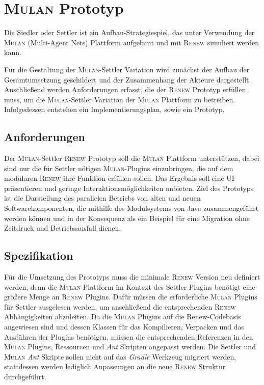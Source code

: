 \chapter{\textsc{Mulan} Prototyp} \label{cha:mulan_settler}
	Die Siedler oder Settler ist ein Aufbau-Strategiespiel, das unter Verwendung der \textsc{Mulan} (Multi-Agent Nets) Plattform aufgebaut und mit \textsc{Renew} simuliert werden kann. \bigbreak
	
	Für die Gestaltung der \textsc{Mulan}-Settler Variation wird zunächst der Aufbau der Gesamtumsetzung geschildert und der Zusammenhang der Akteure dargestellt. Anschließend werden Anforderungen erfasst, die der \textsc{Renew} Prototyp erfüllen muss, um die \textsc{Mulan}-Settler Variation der \textsc{Mulan} Plattform zu betreiben. Infolgedessen entstehen ein Implementierungsplan, sowie ein Prototyp.

\section{Anforderungen} \label{sec:anforderungen2}
	Der \textsc{Mulan}-Settler \textsc{Renew} Prototyp soll die \textsc{Mulan} Plattform unterstützen, dabei sind nur die für Settler nötigen \textsc{Mulan}-Plugins einzubringen, die auf dem modularen \textsc{Renew} ihre Funktion erfüllen sollen. Das Ergebnis soll eine UI präsentieren und geringe Interaktionsmöglichkeiten anbieten.\newline 
	Ziel des Prototyps ist die Darstellung des parallelen Betriebs von alten und neuen Softwarekomponenten, die mithilfe des Modulsystems von Java zusammengeführt werden können und in der Konsequenz als ein Beispiel für eine Migration ohne Zeitdruck und Betriebsausfall dienen.

\section{Spezifikation}
	Für die Umsetzung des Prototyps muss die minimale \textsc{Renew} Version neu definiert werden, denn die \textsc{Mulan} Plattform im Kontext des Settler Plugins benötigt eine größere Menge an \textsc{Renew} Plugins. Dafür müssen die erforderliche \textsc{Mulan} Plugins für Settler ausgelesen werden, um anschließend die entsprechenden \textsc{Renew} Abhängigkeiten abzuleiten. \newline
	Da die \textsc{Mulan} Plugins auf die Renew-Codebasis angewiesen sind und dessen Klassen für das Kompilieren, Verpacken und das Ausführen der Plugins benötigen, müssen die entsprechenden Referenzen in den \textsc{Mulan} Plugins, Ressourcen und \textit{Ant} Skripten angepasst werden. \newline
	Die Settler und \textsc{Mulan} \textit{Ant} Skripte sollen nicht auf das \textit{Gradle} Werkzeug migriert werden, stattdessen werden lediglich Anpassungen an die neue \textsc{Renew} Struktur durchgeführt.\bigbreak
	
